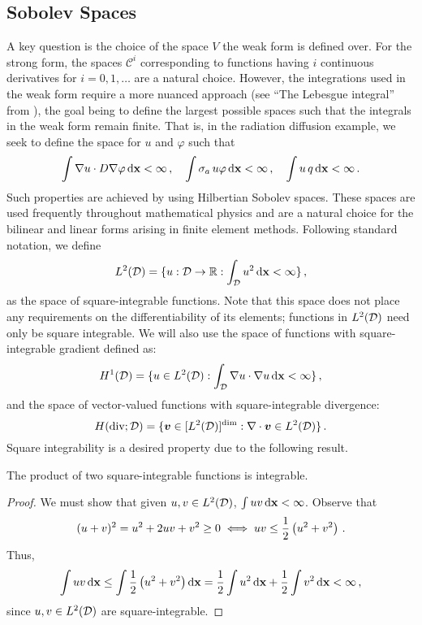 \documentclass[../doc.tex]{subfiles}
\begin{document}
\subsection{Sobolev Spaces} \label{fem_sec:sobolev}
A key question is the choice of the space $V$ the weak form is defined over. For the strong form, the spaces $\mathcal{C}^i$ corresponding to functions having $i$ continuous derivatives for $i = 0,1,\ldots$ are a natural choice. However, the integrations used in the weak form require a more nuanced approach (see ``The Lebesgue integral'' from \textcite{reed1981functional}), the goal being to define the largest possible spaces such that the integrals in the weak form remain finite. That is, in the radiation diffusion example, we seek to define the space for $u$ and $\varphi$ such that 
	\begin{equation} \label{fem:want_finite}
		\int \nabla u \cdot D\nabla\varphi \mathop{}\!\mathrm{d} \boldsymbol{\mathrm{x}} < \infty \,, \quad \int \sigma_a\, u \varphi \mathop{}\!\mathrm{d}\boldsymbol{\mathrm{x}} < \infty \,, \quad \int u\,q \mathop{}\!\mathrm{d} \boldsymbol{\mathrm{x}} < \infty \,. 
	\end{equation}
Such properties are achieved by using Hilbertian Sobolev spaces. These spaces are used frequently throughout mathematical physics and are a natural choice for the bilinear and linear forms arising in finite element methods. Following standard notation, we define 
	\begin{equation}
		L^2(\mathcal{D}) = \{u : \mathcal{D} \rightarrow \mathbb{R} : \int_{\mathcal{D}} u^2 \mathop{}\!\mathrm{d} \boldsymbol{\mathrm{x}} < \infty \} \,, 
	\end{equation}
as the space of square-integrable functions. Note that this space does not place any requirements on the differentiability of its elements; functions in $L^2(\mathcal{D})$ need only be square integrable. We will also use the space of functions with square-integrable gradient defined as: 
	\begin{equation}
		H^1(\mathcal{D}) = \{ u \in L^2(\mathcal{D}) : \int_{\mathcal{D}} \nabla u \cdot \nabla u \mathop{}\!\mathrm{d} \boldsymbol{\mathrm{x}} < \infty \} \,, 
	\end{equation}
and the space of vector-valued functions with square-integrable divergence: 
	\begin{equation}
		H(\operatorname{div};\mathcal{D}) = \{ \boldsymbol{v} \in [L^2(\mathcal{D})]^{\dim} : \nabla\cdot\boldsymbol{v} \in L^2(\mathcal{D}) \} \,. 
	\end{equation}
Square integrability is a desired property due to the following result. 
\begin{prop}
The product of two square-integrable functions is integrable. 
\end{prop}
\begin{proof}
We must show that given $u,v \in L^2(\mathcal{D})$, $\int u v \mathop{}\!\mathrm{d} \boldsymbol{\mathrm{x}} < \infty$. Observe that 
	$$ (u + v)^2 = u^2 + 2 uv + v^2 \geq 0 \iff uv \leq \frac{1}{2}\left( u^2 + v^2 \right) \,. $$ 
Thus, 
	$$ \int uv \mathop{}\!\mathrm{d} \boldsymbol{\mathrm{x}} \leq \int \frac{1}{2}\left( u^2 + v^2 \right) \mathop{}\!\mathrm{d} \boldsymbol{\mathrm{x}} = \frac{1}{2}\int u^2 \mathop{}\!\mathrm{d} \boldsymbol{\mathrm{x}} + \frac{1}{2} \int v^2 \mathop{}\!\mathrm{d} \boldsymbol{\mathrm{x}} < \infty \,, $$
since $u,v \in L^2(\mathcal{D})$ are square-integrable. 
\end{proof}
\end{document}
